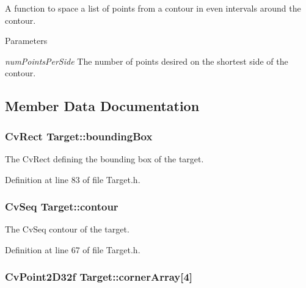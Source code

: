 A function to space a list of points from a contour in even intervals around the contour. 


\begin{DoxyParams}{Parameters}
\item[{\em numPointsPerSide}]The number of points desired on the shortest side of the contour. \end{DoxyParams}


\subsection{Member Data Documentation}
\hypertarget{classTarget_ab883696aeef59f629cd850e0bb3c15e2}{
\subsubsection[{boundingBox}]{\setlength{\rightskip}{0pt plus 5cm}CvRect {\bf Target::boundingBox}}}
\label{classTarget_ab883696aeef59f629cd850e0bb3c15e2}


The CvRect defining the bounding box of the target. 



Definition at line 83 of file Target.h.

\hypertarget{classTarget_a5ea4a01adfb55ca0a5a7355472e02019}{
\subsubsection[{contour}]{\setlength{\rightskip}{0pt plus 5cm}CvSeq {\bf Target::contour}}}
\label{classTarget_a5ea4a01adfb55ca0a5a7355472e02019}


The CvSeq contour of the target. 



Definition at line 67 of file Target.h.

\hypertarget{classTarget_aa77c3e5ee30ba4c31a6633f74b32f62f}{
\subsubsection[{cornerArray}]{\setlength{\rightskip}{0pt plus 5cm}CvPoint2D32f {\bf Target::cornerArray}\mbox{[}4\mbox{]}}}
\label{classTarget_aa77c3e5ee30ba4c31a6633f74b32f62f}


